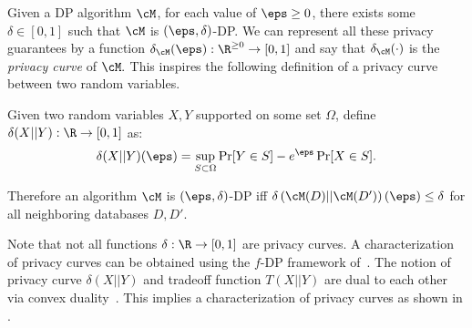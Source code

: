 

Given a DP algorithm $\cM$, for each value of $\eps\ge 0$, there exists some $\delta \in [0,1]$ such that $\cM$ is $(\eps,\delta)$-DP. We can represent all these privacy guarantees by a function $\delta_\cM(\eps):\R^{\ge 0} \to [0,1]$ and say that $\delta_\cM(\cdot)$ is the \emph{privacy curve} of $\cM.$ This inspires the following definition of a privacy curve between two random variables.

\begin{definition}
	Given two random variables $X,Y$ supported on some set $\Omega$, define $\delta(X||Y): \R \to [0,1]$ as:
	$$\delta(X||Y)(\eps) = \sup_{S\subset \Omega} \Pr[Y\in S] - e^\eps \Pr[X\in S].$$
\end{definition}

Therefore an algorithm $\cM$ is $(\eps,\delta)$-DP iff $\delta\lp \cM(D)||\cM(D')\rp(\eps) \le \delta$ for all neighboring databases $D,D'.$ 

\begin{remark}
	Note that not all functions $\delta:\R \to [0,1]$ are privacy curves. A characterization of privacy curves can be obtained using the $f$-DP framework of~\cite{DongRS19}. The notion of privacy curve $\delta(X||Y)$ and tradeoff function $T(X||Y)$ are dual to each other via convex duality~\cite{DongRS19}. This implies a characterization of privacy curves as shown in \cite{zhu2021optimal}.
\end{remark}

